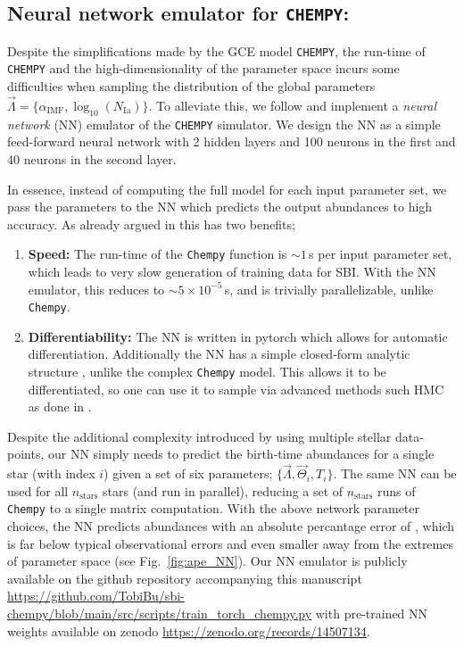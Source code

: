 \documentclass{aa}
\begin{document}
\subsection{Neural network emulator for \texttt{CHEMPY}:}
Despite the simplifications made by the GCE model \texttt{CHEMPY}, the run-time of \texttt{CHEMPY} and the high-dimensionality of the parameter space incurs some difficulties when sampling the distribution of the global parameters $\vec\Lambda = \{\alpha_\mathrm{IMF},\log_{10}(N_\mathrm{Ia})\}$. 
To alleviate this, we follow \cite{Philcox_2019} and implement a \textit{neural network} (NN) emulator of the \texttt{CHEMPY} simulator. We design the NN as a simple feed-forward neural network with 2 hidden layers and 100 neurons in the first and 40 neurons in the second layer.

In essence, instead of computing the full model for each input parameter set, we pass the parameters to the NN which predicts the output abundances to high accuracy. As already argued in \cite{Philcox_2019} this has two benefits;
\begin{enumerate}
    \item \textbf{Speed:} The run-time of the \texttt{Chempy} function is $\sim1$\,s per input parameter set, which leads to very slow generation of training data for SBI. With the NN emulator, this reduces to $\sim5\times10^{-5}$\,s, and is trivially parallelizable, unlike \texttt{Chempy}.
    \item \textbf{Differentiability:} The NN is written in pytorch which allows for automatic differentiation. Additionally the NN has a simple closed-form analytic structure \citep[described in the appendix of][]{Philcox_2019}, unlike the complex \texttt{Chempy} model. This allows it to be differentiated, so one can use it to sample via advanced methods such HMC as done in \citep{Philcox_2019}.
\end{enumerate}

Despite the additional complexity introduced by using multiple stellar data-points, our NN simply needs to predict the birth-time abundances for a single star (with index $i$) given a set of six parameters; $\{\vec\Lambda,\vec\Theta_i,T_i\}$. The same NN can be used for all $n_\mathrm{stars}$ stars (and run in parallel), reducing a set of $n_\mathrm{stars}$ runs of \texttt{Chempy} to a single matrix computation. With the above network parameter choices, the NN predicts abundances with an absolute percantage error of , which is far below typical observational errors and even smaller away from the extremes of parameter space (see Fig.~\ref{fig:ape_NN}).
Our NN emulator is publicly available on the github repository accompanying this manuscript \href{https://github.com/TobiBu/sbi-chempy/blob/main/src/scripts/train_torch_chempy.py}{https://github.com/TobiBu/sbi-chempy/blob/main/src/scripts/train\_torch\_chempy.py} with pre-trained NN weights available on zenodo \href{https://zenodo.org/records/14507134}{https://zenodo.org/records/14507134}.
\end{document}
